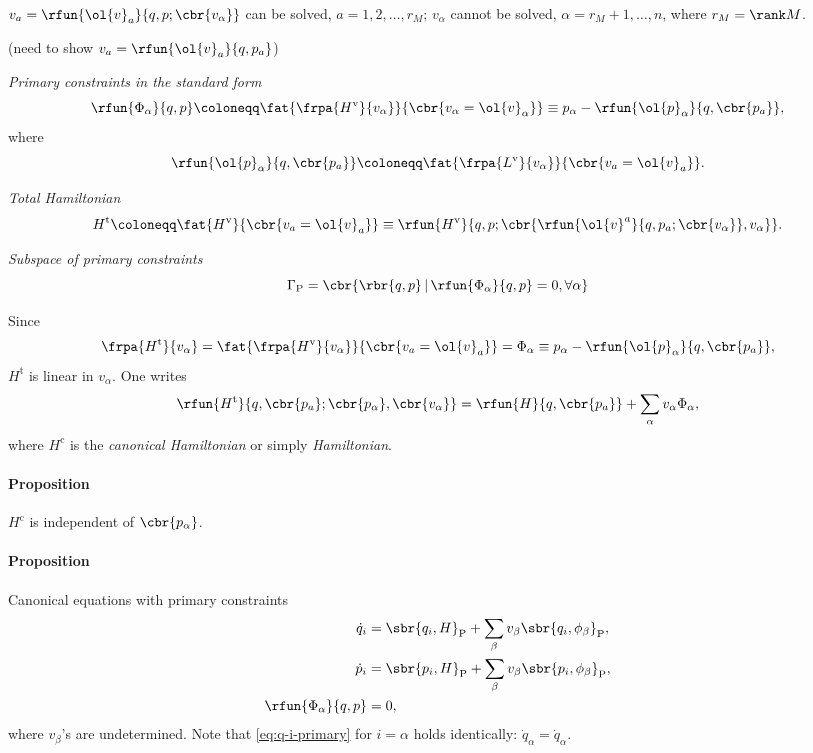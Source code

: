\documentclass[a4paper,11pt]{article}
\begin{document}
$v_a = \rfun{\ol{v}_a}{q,p;\cbr{v_\alpha}}$ can be solved, $a = 1, 2, \ldots, 
r_M$; $v_\alpha$ 
cannot be solved, $\alpha = r_M + 1, \ldots, n$, where $r_M = \rank M$.

(need to show $v_a = \rfun{\ol{v}_a}{q,p_a}$)

\emph{Primary constraints in the standard form}
\begin{equation}
\rfun{\Phi_\alpha}{q, p} \coloneqq
\fat{\frpa{H^\text{v}}{v_\alpha}}{\cbr{v_\alpha = \ol{v}_\alpha}} \equiv
p_\alpha - \rfun{\ol{p}_\alpha}{q, \cbr{p_a}},
\end{equation}
where
\begin{equation}
\rfun{\ol{p}_\alpha}{q, \cbr{p_a}} 
\coloneqq \fat{\frpa{L^\text{v}}{v_\alpha}}{\cbr{v_a = \ol{v}_a}}.
\end{equation}


\emph{Total Hamiltonian}
\begin{equation}
H^\text{t} \coloneqq \fat{H^\text{v}}{\cbr{v_a = \ol{v}_a}} \equiv
\rfun{H^\text{v}}{q, p; \cbr{\rfun{\ol{v}^a}{q, p_a; \cbr{v_\alpha}}, 
v_\alpha}}.
\end{equation}

\emph{Subspace of primary constraints}
\begin{equation}
\Gamma_\text{P} = \cbr{ \rbr{q, p}\, |\, \rfun{\Phi_\alpha}{q, p} = 0, 
\forall \alpha}
\end{equation}

Since
\begin{equation}
\frpa{H^\text{t}}{v_\alpha} =
\fat{\frpa{H^\text{v}}{v_\alpha}}{\cbr{v_a = \ol{v}_a}} = \Phi_\alpha
\equiv p_\alpha - \rfun{\ol{p}_\alpha}{q, \cbr{p_a}},
\end{equation}
$H^\text{t}$ is linear in $v_\alpha$. One writes
\begin{equation}
\rfun{H^\text{t}}{q, \cbr{p_a}; \cbr{p_\alpha}, \cbr{v_\alpha}} = \rfun{H}{q, 
\cbr{p_a}} + \sum_\alpha v_\alpha \Phi_\alpha,
\end{equation}
where $H^\text{c}$ is the \emph{canonical Hamiltonian} or simply 
\emph{Hamiltonian}.

\paragraph{Proposition}
$H^\text{c}$ is independent of $\cbr{p_\alpha}$.

\paragraph{Proposition}
Canonical equations with primary constraints
\begin{align}
\dot{q}_i &= \sbr{q_i, H}_\text{P} + \sum_\beta v_\beta 
\sbr{q_i, \phi_\beta}_\text{P},
\label{eq:q-i-primary}\\
\dot{p}_i &= \sbr{p_i, H}_\text{P} + \sum_\beta v_\beta 
\sbr{p_i, \phi_\beta}_\text{P}, \\
\rfun{\Phi_\alpha}{q, p} &= 0,
\end{align}
where $v_\beta$'s are undetermined. Note that \cref{eq:q-i-primary} for $i = 
\alpha$ holds identically: $\dot{q}_\alpha = \dot{q}_\alpha$.
\end{document}
